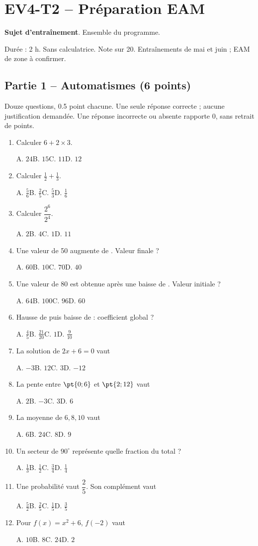 \mxnewpage\section*{EV4-T2 -- Préparation EAM}\label{EV4-T2}
\textbf{Sujet d’entraînement}. Ensemble du programme.\par Durée : 2 h. Sans calculatrice. Note sur 20. Entraînements de mai et juin ; EAM de zone à confirmer.
\subsection*{Partie 1 -- Automatismes (6 points)}
Douze questions, \num{0,5} point chacune. Une seule réponse correcte ; aucune justification demandée. Une réponse incorrecte ou absente rapporte 0, sans retrait de points.
\begin{enumerate}
\item Calculer $6+2\times3$.\par A. $24$\quad B. $15$\quad C. $11$\quad D. $12$
\item Calculer $\frac12+\frac13$.\par A. $\frac{5}{6}$\quad B. $\frac{2}{5}$\quad C. $\frac{5}{3}$\quad D. $\frac{1}{6}$
\item Calculer $\dfrac{2^6}{2^{4}}$.\par A. $2$\quad B. $4$\quad C. $1$\quad D. $11$
\item Une valeur de 50 augmente de . Valeur finale ?\par A. $60$\quad B. $10$\quad C. $70$\quad D. $40$
\item Une valeur de 80 est obtenue après une baisse de . Valeur initiale ?\par A. $64$\quad B. $100$\quad C. $96$\quad D. $60$
\item Hausse de  puis baisse de  : coefficient global ?\par A. $\frac{4}{5}$\quad B. $\frac{21}{20}$\quad C. $1$\quad D. $\frac{9}{10}$
\item La solution de $2x+6=0$ vaut\par A. $-3$\quad B. $12$\quad C. $3$\quad D. $-12$
\item La pente entre $\pt{0;6}$ et $\pt{2;12}$ vaut\par A. $2$\quad B. $-3$\quad C. $3$\quad D. $6$
\item La moyenne de $6, 8, 10$ vaut\par A. $6$\quad B. $24$\quad C. $8$\quad D. $9$
\item Un secteur de $90^\circ$ représente quelle fraction du total ?\par A. $\frac{1}{3}$\quad B. $\frac{1}{2}$\quad C. $\frac{3}{4}$\quad D. $\frac{1}{4}$
\item Une probabilité vaut $\dfrac{2}{5}$. Son complément vaut\par A. $\frac{5}{2}$\quad B. $\frac{2}{5}$\quad C. $\frac{1}{5}$\quad D. $\frac{3}{5}$
\item Pour $f(x)=x^2+6$, $f(-2)$ vaut\par A. $10$\quad B. $8$\quad C. $24$\quad D. $2$
\end{enumerate}
